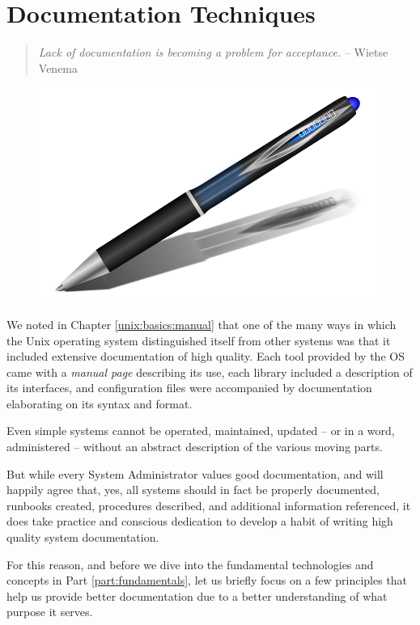 \chapter{Documentation Techniques}
\label{chap:documentation}

\begin{quote}
{\em Lack of documentation is becoming a problem for acceptance.}
-- Wietse Venema
\end{quote}

\begin{figure}[hb]
	\raggedleft
	\includegraphics[width=.15\textwidth]{03/pics/pen}
	\label{fig:pen}
\end{figure}


We noted in Chapter \ref{unix:basics:manual} that one
of the many ways in which the Unix operating system
distinguished itself from other systems was that it
included extensive documentation of high quality.
Each tool provided by the OS came with a {\em manual
page} describing its use, each
library included a description of its interfaces, and
configuration files were accompanied by documentation
elaborating on its syntax and format.

Even simple systems cannot be operated, maintained,
updated -- or in a word, administered -- without an
abstract description of the various moving parts.

But while every System Administrator values good
documentation, and will happily agree that, yes, all
systems should in fact be properly documented,
runbooks created, procedures described, and additional
information referenced, it does take practice and
conscious dedication to develop a habit of writing
high quality system documentation.

For this reason, and before we dive into the
fundamental technologies and concepts in Part
\ref{part:fundamentals}, let us briefly focus on a few
principles that help us provide better documentation
due to a better understanding of what purpose it
serves.

